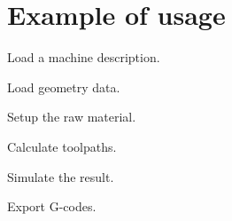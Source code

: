 \section{Example of usage}

Load a machine description.


Load geometry data.


Setup the raw material.


Calculate toolpaths.


Simulate the result.


Export G-codes.


